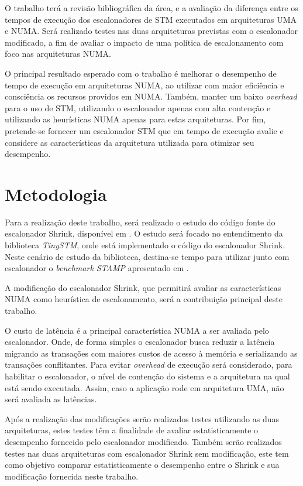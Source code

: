 \documentclass[diss-proposta,nocipinfo]{texufpel}
\begin{document}
O trabalho terá a revisão bibliográfica da área, e a avaliação da diferença entre os tempos de execução dos escalonadores de STM executados em arquiteturas UMA e NUMA. Será realizado testes nas duas arquiteturas previstas com o escalonador modificado, a fim de avaliar o impacto de uma política de escalonamento com foco nas arquiteturas NUMA.

O principal resultado esperado com o trabalho é melhorar o desempenho de tempo de execução em arquiteturas NUMA, ao utilizar com maior eficiência e consciência os recursos providos em NUMA. Também, manter um baixo \emph{overhead} para o uso de STM, utilizando o escalonador apenas com alta contenção e utilizando as heurísticas NUMA apenas para estas arquiteturas. Por fim, pretende-se fornecer um escalonador STM que em tempo de execução avalie e considere as características da arquitetura utilizada para otimizar seu desempenho.

\chapter{Metodologia}

Para a realização deste trabalho, será realizado o estudo do código fonte do escalonador Shrink, disponível em \cite{shrink09}. O estudo será focado no entendimento da biblioteca \emph{TinySTM}, onde está implementado o código do escalonador Shrink. Neste cenário de estudo da biblioteca, destina-se tempo para utilizar junto com escalonador o \emph{benchmark STAMP} apresentado em \cite{STAMP}.

A modificação do escalonador Shrink, que permitirá avaliar as características NUMA como heurística de escalonamento, será a contribuição principal deste trabalho.

O custo de latência é a principal característica NUMA a ser avaliada pelo escalonador. Onde, de forma simples o escalonador busca reduzir a latência migrando as transações com maiores custos de acesso à memória e serializando as transações conflitantes. Para evitar \emph{overhead} de execução será considerado, para habilitar o escalonador, o nível de contenção do sistema e a arquitetura na qual está sendo executada. Assim, caso a aplicação rode em arquitetura UMA, não será avaliada as latências.

Após a realização das modificações serão realizados testes utilizando as duas arquiteturas, estes testes têm a finalidade de avaliar estatisticamente o desempenho fornecido pelo escalonador modificado. Também serão realizados testes nas duas arquiteturas com escalonador Shrink sem modificação, este tem como objetivo comparar estatisticamente o desempenho entre o Shrink e sua modificação fornecida neste trabalho.
\end{document}
